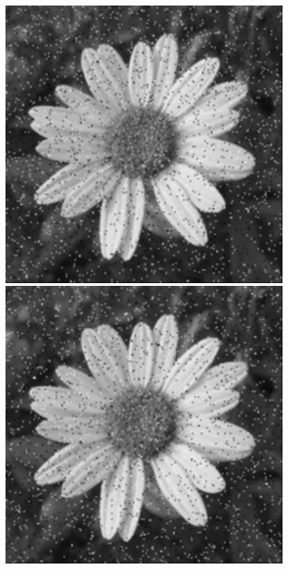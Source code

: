 \documentclass[a4paper]{report}
\begin{document}
\begin{figure}[H]
\centering
\begin{minipage}{.3\textwidth}
  \centering
    \includegraphics[width=0.95\textwidth]{images/Smooth/spatial-salt-n-pepper/flower_smooth_spatial_gaussian_5_2.png}
\end{minipage}%
\begin{minipage}{.3\textwidth}
  \centering
    \includegraphics[width=0.95\textwidth]{images/Smooth/spatial-salt-n-pepper/flower_smooth_spatial_gaussian_10_2.png}

\end{minipage}
\end{figure}
\end{document}
